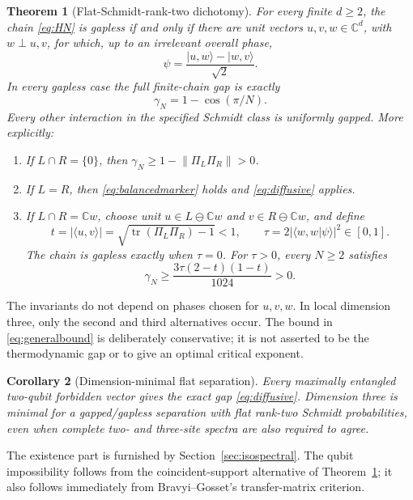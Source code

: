 \documentclass[11pt,a4paper]{article}
\newtheorem{theorem}{Theorem}[section]
\newtheorem{corollary}[theorem]{Corollary}
\theoremstyle{remark}\newtheorem{remark}[theorem]{Remark}
\newcommand{\C}{\mathbb C}
\newcommand{\ket}[1]{\lvert #1\rangle}
\newcommand{\norm}[1]{\left\lVert #1\right\rVert}
\begin{document}
\begin{theorem}[Flat-Schmidt-rank-two dichotomy]\label{thm:classification}
For every finite $d\ge2$, the chain \eqref{eq:HN} is gapless if and only if there are unit vectors $u,v,w\in\C^d$, with $w\perp u,v$, for which, up to an irrelevant overall phase,
\begin{equation}\label{eq:balancedmarker}
 \psi=\frac{\ket{u,w}-\ket{w,v}}{\sqrt2}.
\end{equation}
In every gapless case the full finite-chain gap is exactly
\begin{equation}\label{eq:diffusive}
 \gamma_N=1-\cos(\pi/N).
\end{equation}
Every other interaction in the specified Schmidt class is uniformly gapped. More explicitly:
\begin{enumerate}
\item If $L\cap R=\{0\}$, then $\gamma_N\ge1-\norm{\Pi_L\Pi_R}>0$.
\item If $L=R$, then \eqref{eq:balancedmarker} holds and \eqref{eq:diffusive} applies.
\item If $L\cap R=\C w$, choose unit $u\in L\ominus\C w$ and $v\in R\ominus\C w$, and define
\begin{equation}\label{eq:invariants}
 t=|\langle u,v\rangle|=\sqrt{\operatorname{tr}(\Pi_L\Pi_R)-1}<1,
 \qquad \tau=2|\langle w,w|\psi\rangle|^2\in[0,1].
\end{equation}
The chain is gapless exactly when $\tau=0$. For $\tau>0$, every $N\ge2$ satisfies
\begin{equation}\label{eq:generalbound}
 \gamma_N\ge \frac{3\tau(2-t)(1-t)}{1024}>0.
\end{equation}
\end{enumerate}
\end{theorem}
The invariants do not depend on phases chosen for $u,v,w$. In local dimension three, only the second and third alternatives occur. The bound in \eqref{eq:generalbound} is deliberately conservative; it is not asserted to be the thermodynamic gap or to give an optimal critical exponent.

\begin{corollary}[Dimension-minimal flat separation]\label{cor:minimal}
Every maximally entangled two-qubit forbidden vector gives the exact gap \eqref{eq:diffusive}. Dimension three is minimal for a gapped/gapless separation with flat rank-two Schmidt probabilities, even when complete two- and three-site spectra are also required to agree.
\end{corollary}
The existence part is furnished by Section~\ref{sec:isospectral}. The qubit impossibility follows from the coincident-support alternative of Theorem~\ref{thm:classification}; it also follows immediately from Bravyi--Gosset's transfer-matrix criterion.
\end{document}
